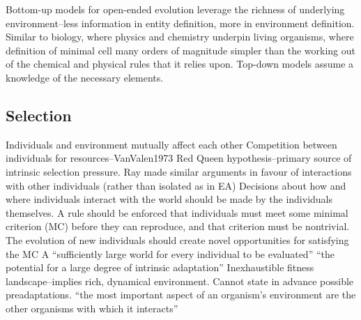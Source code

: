 \begin{NOTES}
Bottom-up models for open-ended evolution leverage the richness of underlying environment--less information in entity definition, more in environment definition. Similar to biology, where physics and chemistry underpin living organisms, where definition of minimal cell many orders of magnitude simpler than the working out of the chemical and physical rules that it relies upon. Top-down models assume a knowledge of the necessary elements.

\subsection{Selection}
Individuals and environment mutually affect each other \parencite{Taylor2001}
Competition between individuals for resources--VanValen1973 Red Queen hypothesis--primary source of intrinsic selection pressure. \parencite{Taylor2001}
Ray made similar arguments in favour of interactions with other individuals (rather than isolated as in EA) 
Decisions about how and where individuals interact with the world should be made by the individuals themselves. \parencite{Soros2014}
A rule should be enforced that individuals must meet some minimal criterion (MC) before they can reproduce, and that criterion must be nontrivial.\parencite{Soros2014}
The evolution of new individuals should create novel opportunities for satisfying the MC \parencite{Soros2014}
A ``sufficiently large world for every individual to be evaluated'' \parencite{Soros2014}
``the potential for a large degree of intrinsic adaptation'' \parencite{Taylor2001}
Inexhaustible fitness landscape--implies rich, dynamical environment. \parencite{Vasas2015}
Cannot state in advance possible preadaptations. \parencite{Vasas2015}
``the most important aspect of an organism's environment are the other organisms with which it interacts'' \parencite{Maley1999}


\end{NOTES}
